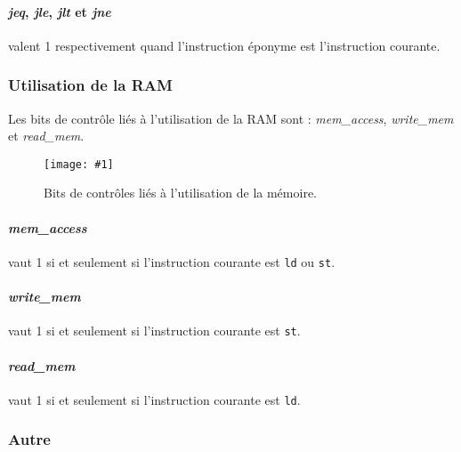 \documentclass[twoside, 12pt, a4paper]{article}
\newcommand{\cf}[3]{
    \begin{figure}[!h]
        \centering
        \texttt{[image: \#1]}
    \caption{#3}\label{Fig:#1}
    \end{figure}
}
\newcommand{\hcf}[2]{\cf{#1}{.75}{#2}}
\begin{document}
\paragraph{\textit{jeq}, \textit{jle}, \textit{jlt} et \textit{jne}} valent 1 respectivement quand l'instruction éponyme est l'instruction courante.

\clearpage

\subsubsection{Utilisation de la RAM}

Les bits de contrôle liés à l'utilisation de la RAM sont : \textit{mem\_access}, \textit{write\_mem} et \textit{read\_mem}.

\hcf{ctrl_mem.png}{Bits de contrôles liés à l'utilisation de la mémoire.}

\paragraph{\textit{mem\_access}} vaut 1 si et seulement si l'instruction courante est \texttt{ld} ou \texttt{st}.

\paragraph{\textit{write\_mem}} vaut 1 si et seulement si l'instruction courante est \texttt{st}.

\paragraph{\textit{read\_mem}} vaut 1 si et seulement si l'instruction courante est \texttt{ld}.

\clearpage

\subsubsection{Autre}
\end{document}
